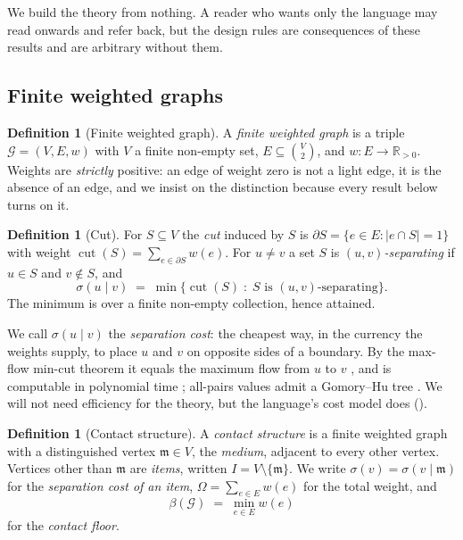\documentclass[11pt,twocolumn,a4paper]{article}
\theoremstyle{plain}
\theoremstyle{definition}
\newtheorem{definition}[theorem]{Definition}
\theoremstyle{remark}
\newcommand{\flo}{\beta}                       %
\newcommand{\sep}{\sigma}                      %
\newcommand{\med}{\mathfrak{m}}                %
\newcommand{\Gph}{\mathcal{G}}
\newcommand{\Ver}{V}
\newcommand{\Edg}{E}
\newcommand{\weight}{w}
\newcommand{\Om}{\Omega}
\newcommand{\Rp}{\mathbb{R}_{>0}}
\DeclareMathOperator{\cut}{cut}
\begin{document}
We build the theory from nothing. A reader who wants only the language
may read  onwards and refer back, but the design rules
are consequences of these results and are arbitrary without them.

\subsection{Finite weighted graphs}

\begin{definition}[Finite weighted graph]
\label{def:fwg}
A \emph{finite weighted graph} is a triple $\Gph=(\Ver,\Edg,\weight)$
with $\Ver$ a finite non-empty set, $\Edg\subseteq\binom{\Ver}{2}$, and
$\weight:\Edg\to\Rp$. Weights are \emph{strictly} positive: an edge of
weight zero is not a light edge, it is the absence of an edge, and we
insist on the distinction because every result below turns on it.
\end{definition}

\begin{definition}[Cut]
\label{def:cut}
For $S\subseteq\Ver$ the \emph{cut} induced by $S$ is
$\partial S=\{e\in\Edg: |e\cap S|=1\}$ with weight
$\cut(S)=\sum_{e\in\partial S}\weight(e)$. For $u\ne v$ a set $S$ is
\emph{$(u,v)$-separating} if $u\in S$ and $v\notin S$, and
\[
  \sep(u\mid v)\;=\;\min\{\cut(S)\;:\;S \text{ is }(u,v)\text{-separating}\}.
\]
The minimum is over a finite non-empty collection, hence attained.
\end{definition}

We call $\sep(u\mid v)$ the \emph{separation cost}: the cheapest way, in
the currency the weights supply, to place $u$ and $v$ on opposite sides
of a boundary. By the max-flow min-cut theorem it equals the maximum
flow from $u$ to $v$ \cite{ford1956maximal}, and is computable in
polynomial time \cite{stoer1997simple,karger1996new}; all-pairs values
admit a Gomory--Hu tree \cite{gomory1961multi}. We will not need
efficiency for the theory, but the language's cost model does
().

\begin{definition}[Contact structure]
\label{def:contact}
A \emph{contact structure} is a finite weighted graph with a
distinguished vertex $\med\in\Ver$, the \emph{medium}, adjacent to every
other vertex. Vertices other than $\med$ are \emph{items}, written
$I=\Ver\setminus\{\med\}$. We write
$\sep(v)=\sep(v\mid\med)$ for the \emph{separation cost of an item},
$\Om=\sum_{e\in\Edg}\weight(e)$ for the total weight, and
\[
  \flo(\Gph)\;=\;\min_{e\in\Edg}\weight(e)
\]
for the \emph{contact floor}.
\end{definition}
\end{document}
